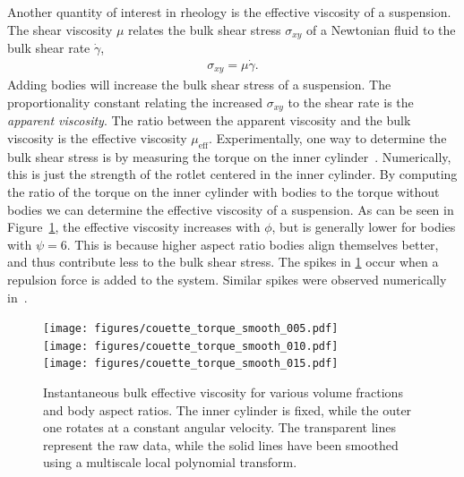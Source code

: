 \documentclass[preprint, 10pt]{elsarticle}
\begin{document}
Another quantity of interest in rheology is the effective viscosity of a
suspension. The shear viscosity $\mu$ relates the bulk shear stress
$\sigma_{xy}$ of a Newtonian fluid to the bulk shear rate
$\dot{\gamma}$, 
\begin{align*}
  \sigma_{xy} = \mu\dot{\gamma}.
\end{align*}
Adding bodies will increase the bulk shear stress of a suspension.  The
proportionality constant relating the increased $\sigma_{xy}$ to the
shear rate is the {\em apparent viscosity}. The ratio between the
apparent viscosity and the bulk viscosity is the effective viscosity
$\mu_{\text{eff}}$.  Experimentally, one way to determine the bulk shear
stress is by measuring the torque on the inner cylinder~\cite{Koos2012}.
Numerically, this is just the strength of the rotlet centered in the
inner cylinder.  By computing the ratio of the torque on the inner
cylinder with bodies to the torque without bodies we can determine the
effective viscosity of a suspension.  As can be seen in
Figure~\ref{fig:torque}, the effective viscosity increases with $\phi$,
but is generally lower for bodies with $\psi=6$. This is because higher
aspect ratio bodies align themselves better, and thus contribute less to
the bulk shear stress. The spikes in \ref{fig:torque} occur when a
repulsion force is added to the system. Similar spikes were observed
numerically in~\cite{Lu2017}.
\begin{figure}[!h]
\begin{center}
\texttt{[image: figures/couette\_torque\_smooth\_005.pdf]}\\
\texttt{[image: figures/couette\_torque\_smooth\_010.pdf]}\\
\texttt{[image: figures/couette\_torque\_smooth\_015.pdf]}
\end{center}
\caption{Instantaneous bulk effective viscosity for various volume
fractions and body aspect ratios. The inner
cylinder is fixed, while the outer one rotates at a constant angular velocity. The transparent lines represent the raw data, while the solid lines have been smoothed using a multiscale local polynomial transform. }\label{fig:torque}
\end{figure} 
\end{document}
